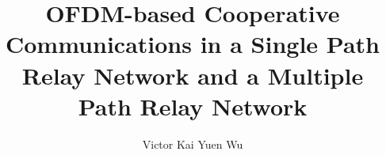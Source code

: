\documentclass{gatech-thesis}
\title{OFDM-based Cooperative Communications in a Single Path Relay Network and a Multiple Path Relay Network}
\author{Victor Kai Yuen Wu}
\begin{document}

%
\begin{preliminary}
%
\begin{acknowledgements}

\end{acknowledgements}
%
\contents
%
\begin{summary}

\end{summary}
\end{preliminary}
%




\begin{postliminary}
%
\end{postliminary}
\end{document}

